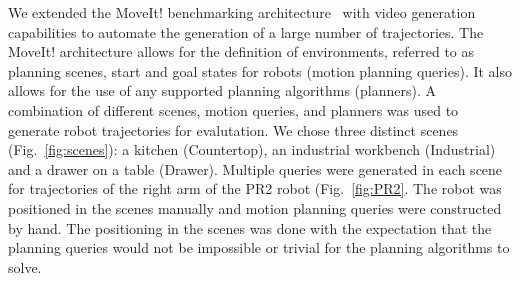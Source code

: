 \documentclass[letterpaper, 10 pt, conference]{ieeeconf}  %
\begin{document}
We extended the MoveIt! benchmarking architecture~\cite{cohen2012generic} with video generation capabilities to automate the generation of a large number of trajectories. The MoveIt! architecture allows for the definition of environments, referred to as planning scenes, start and goal states for robots (motion planning queries). It also allows for the use of any supported planning algorithms (planners). A combination of different scenes, motion queries, and planners was used to generate robot trajectories for evalutation. We chose three distinct scenes (Fig.~\ref{fig:scenes}): a kitchen (Countertop), an industrial workbench (Industrial) and a drawer on a table (Drawer). Multiple queries were generated in each scene for trajectories of the right arm of the PR2 robot (Fig.~\ref{fig:PR2}. The robot was positioned in the scenes manually and motion planning queries were constructed by hand. The positioning in the scenes was done with the expectation that the planning queries would not be impossible or trivial for the planning algorithms to solve. 

\begin{table}[t]
\centering
{}
\caption{The four rating categories/attributes and the associated scales for each presented to the survey respondent.}
\label{tab:rating_scales}
\end{table}

\end{document}
